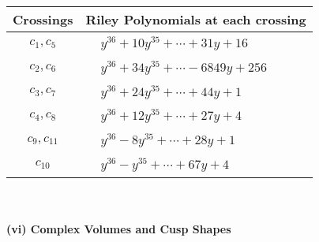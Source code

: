 \documentclass[1p]{elsarticle_modified}
\theoremstyle{definition}
\begin{document}
\begin{tabular}{m{50pt}|m{274pt}}
Crossings & \hspace{64pt}Riley Polynomials at each crossing \\
\hline $$\begin{aligned}c_{1},c_{5}\end{aligned}$$&$\begin{aligned}
&y^{36}+10 y^{35}+\cdots+31 y+16
\end{aligned}$\\
\hline $$\begin{aligned}c_{2},c_{6}\end{aligned}$$&$\begin{aligned}
&y^{36}+34 y^{35}+\cdots-6849 y+256
\end{aligned}$\\
\hline $$\begin{aligned}c_{3},c_{7}\end{aligned}$$&$\begin{aligned}
&y^{36}+24 y^{35}+\cdots+44 y+1
\end{aligned}$\\
\hline $$\begin{aligned}c_{4},c_{8}\end{aligned}$$&$\begin{aligned}
&y^{36}+12 y^{35}+\cdots+27 y+4
\end{aligned}$\\
\hline $$\begin{aligned}c_{9},c_{11}\end{aligned}$$&$\begin{aligned}
&y^{36}-8 y^{35}+\cdots+28 y+1
\end{aligned}$\\
\hline $$\begin{aligned}c_{10}\end{aligned}$$&$\begin{aligned}
&y^{36}- y^{35}+\cdots+67 y+4
\end{aligned}$\\
\hline
\end{tabular}\\~\\
\newpage\flushleft \textbf{(vi) Complex Volumes and Cusp Shapes}
\end{document}
